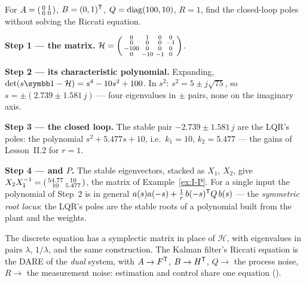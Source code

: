 \begin{example}
\label{ex:I-ham}
For $A = \begin{psmallmatrix}0 & 1\\ 0 & 0\end{psmallmatrix}$, $B = (0, 1)^{\mathsf{T}}$, $Q = \operatorname{diag}(100, 10)$, $R = 1$, find the closed-loop poles without solving the Riccati equation.

\textbf{Step 1 — the matrix.} $\mathcal H = \begin{psmallmatrix}0 & 1 & 0 & 0\\ 0 & 0 & 0 & -1\\ -100 & 0 & 0 & 0\\ 0 & -10 & -1 & 0\end{psmallmatrix}$.

\textbf{Step 2 — its characteristic polynomial.} Expanding, $\det(s\Id - \mathcal H) = s^4 - 10s^2 + 100$. In $s^2$: $s^2 = 5 \pm j\sqrt{75}$, so $s = \pm(2.739 \pm 1.581\,j)$ — four eigenvalues in $\pm$ pairs, none on the imaginary axis.

\textbf{Step 3 — the closed loop.} The stable pair $-2.739 \pm 1.581\,j$ are the LQR's poles: the polynomial $s^2 + 5.477s + 10$, i.e.\ $k_1 = 10$, $k_2 = 5.477$ — the gains of Lesson~II.2 for $r = 1$.

\textbf{Step 4 — and $P$.} The stable eigenvectors, stacked as $X_1$, $X_2$, give $X_2X_1^{-1} = \begin{psmallmatrix}54.77 & 10\\ 10 & 5.477\end{psmallmatrix}$, the matrix of Example~\ref{ex:I-P}. For a single input the polynomial of Step~2 is in general $a(s)a(-s) + \tfrac1r\,b(-s)^{\mathsf{T}} Q\,b(s)$ — the \emph{symmetric root locus}: the LQR's poles are the stable roots of a polynomial built from the plant and the weights.
\end{example}

The discrete equation has a symplectic matrix in place of $\mathcal H$, with eigenvalues in pairs $\lambda$, $1/\lambda$, and the same construction. The Kalman filter's Riccati equation is the DARE of the \emph{dual} system, with $A \to F^{\mathsf{T}}$, $B \to H^{\mathsf{T}}$, $Q \to$ the process noise, $R \to$ the measurement noise: estimation and control share one equation ().

